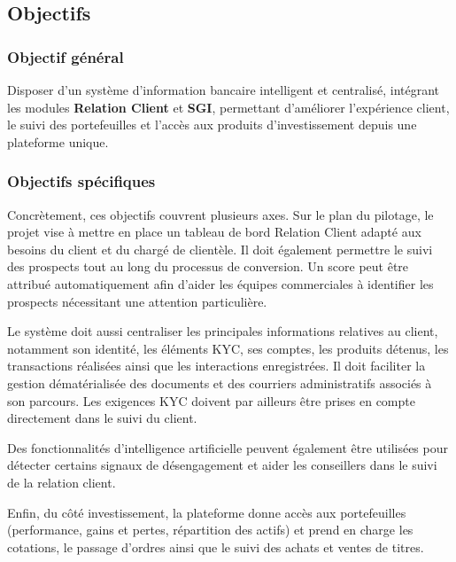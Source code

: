 \subsection{Objectifs}

\subsubsection{Objectif général}

Disposer d'un système d'information bancaire intelligent et centralisé,
intégrant les modules \textbf{Relation Client} et \textbf{SGI}, permettant
d'améliorer l'expérience client, le suivi des portefeuilles et l'accès aux
produits d'investissement depuis une plateforme unique.

\subsubsection{Objectifs spécifiques}

Concrètement, ces objectifs couvrent plusieurs axes. Sur le plan du pilotage, le
projet vise à mettre en place un tableau de bord Relation Client adapté aux
besoins du client et du chargé de clientèle.
Il doit également permettre le suivi des prospects tout au long du processus de conversion. Un score peut être attribué automatiquement afin d'aider les équipes commerciales à identifier les prospects nécessitant une attention particulière.

Le système doit aussi centraliser les principales informations relatives au client, notamment son identité, les éléments KYC, ses comptes, les produits détenus, les transactions réalisées ainsi que les interactions enregistrées. Il doit faciliter la gestion dématérialisée des documents et des courriers administratifs associés à son parcours. Les exigences KYC doivent par ailleurs être prises en compte directement dans le suivi du client.

Des fonctionnalités d'intelligence artificielle peuvent également être utilisées pour détecter certains signaux de désengagement et aider les conseillers dans le suivi de la relation client.

Enfin, du côté investissement, la
plateforme donne accès aux portefeuilles (performance, gains et pertes,
répartition des actifs) et prend en charge les cotations, le passage d'ordres
ainsi que le suivi des achats et ventes de titres.



